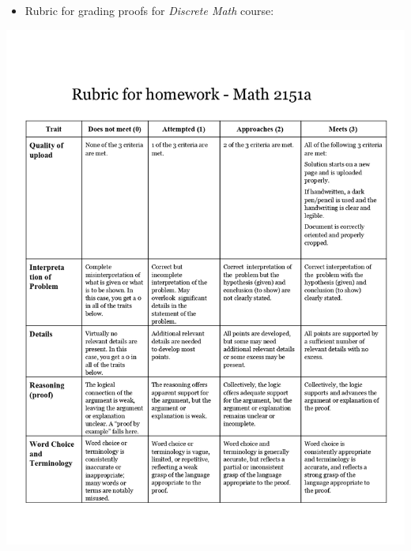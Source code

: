 \documentclass[
]{report}
\providecommand{\tightlist}{%
  \setlength{\itemsep}{0pt}\setlength{\parskip}{0pt}}
\begin{document}
\begin{itemize}
\tightlist
\item
  Rubric for grading proofs for \emph{Discrete Math} course:
\end{itemize}

\includegraphics{images/Rubric for homework - Math 2151a_page-0001.jpg}
\end{document}
